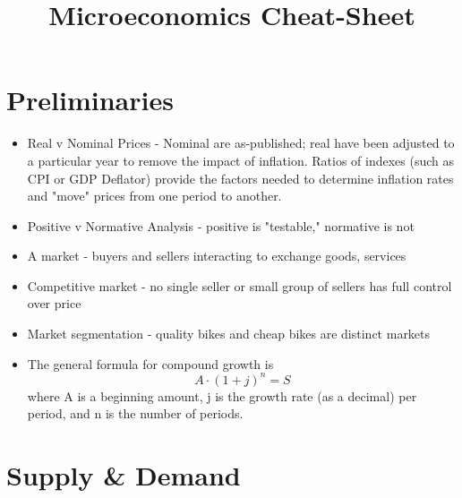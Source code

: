 \documentclass{exam}
\author{}
\date{}
\title{Microeconomics Cheat-Sheet}
\begin{document}
\maketitle

\section{Preliminaries}

\begin{itemize}
  \item Real v Nominal Prices - Nominal are as-published; real have been adjusted to a particular year to remove the impact of inflation.  Ratios of indexes (such as CPI or GDP Deflator) provide the factors needed to determine inflation rates and "move" prices from one period to another.
  \item Positive v Normative Analysis - positive is "testable," normative is not
  \item A market - buyers and sellers interacting to exchange goods, services
  \item Competitive market - no single seller or small group of sellers has full control over price
  \item Market segmentation - quality bikes and cheap bikes are distinct markets
  \item The general formula for compound growth is
    $$A \cdot (1+j)^n = S$$
    where A is a beginning amount, j is the growth rate (as a decimal) per period, and n is the number of periods.
\end{itemize}

\section{Supply \& Demand}
\end{document}

